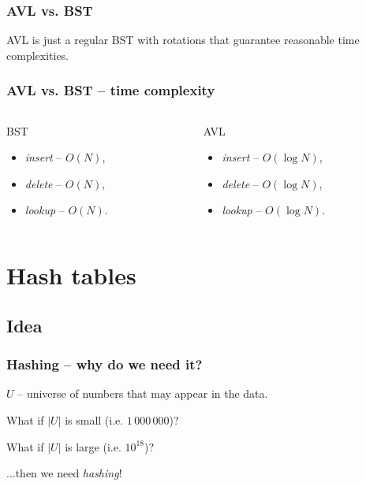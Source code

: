 \documentclass{beamer}
\begin{document}
\begin{frame}
    \frametitle{AVL vs. BST}
    AVL is just a regular BST with rotations that guarantee reasonable
    time complexities. \pause

    \centering
\end{frame}

\begin{frame}
    \frametitle{AVL vs. BST -- time complexity}
    \begin{columns}
    \begin{column}{0.5\textwidth}
    \centering
    \begin{block}{BST}
    \begin{itemize}
        \item \textit{insert} -- $O(N)$,
        \item \textit{delete} -- $O(N)$,
        \item \textit{lookup} -- $O(N)$.
    \end{itemize}
    \end{block}
    \end{column}
    \pause
    \begin{column}{0.5\textwidth}
    \centering
    \begin{block}{AVL}
    \begin{itemize}
        \item \textit{insert} -- $O(\log N)$,
        \item \textit{delete} -- $O(\log N)$,
        \item \textit{lookup} -- $O(\log N)$.
    \end{itemize}
    \end{block}
    \end{column}
    \end{columns}
\end{frame}

\section{Hash tables}

\subsection{Idea}

\begin{frame}
    \frametitle{Hashing -- why do we need it?}

    \pause
    \begin{block}{}
    $U$ -- universe of numbers that may appear in the data.
    \end{block}

    What if $|U|$ is small (i.e. $1\,000\,000$)? \pause

    \medskip
    What if $|U|$ is large (i.e. $10^{18}$)? \pause

    \medskip
    ...then we need \textit{hashing}!
\end{frame}
\end{document}
